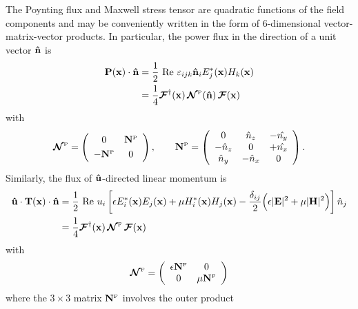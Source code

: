 \documentclass[letterpaper]{article}
\begin{document}
The Poynting flux and Maxwell stress tensor are quadratic functions
of the field components and may be conveniently written in the form
of 6-dimensional vector-matrix-vector products. 
In particular, the power flux in the direction of a unit vector 
$\mathbf{\hat n}$ is
\begin{align}
 \mathbf{P}(\mathbf{x}) \cdot \mathbf{\hat n}
   &=\frac{1}{2}\text{ Re }\varepsilon_{ijk}\mathbf{\hat n}_i E^*_j(\mathbf{x}) H_k(\mathbf{x})
\nonumber \\
   &=\frac{1}{4}\boldsymbol{\mathcal{F}}^\dagger(\mathbf{x}) \, \boldsymbol{\mathcal{N}}^{\hbox{\tiny{P}}}(\mathbf{\hat n}) \, \boldsymbol{\mathcal{F}}(\mathbf{x})
\label{PVMVP}
\end{align}
with
$$
   \boldsymbol{\mathcal{N}}^{\hbox{\tiny{P}}}=
   \left(\begin{array}{cc}
   0       & \mathbf{N}^{\hbox{\tiny{P}}}   \\ [3pt]
  -\mathbf{N}^{\hbox{\tiny{P}}} & 0
   \end{array}\right), 
\qquad 
   \mathbf{N}^{\hbox{\tiny{P}}}
   =
   \left(\begin{array}{ccc}
   0          &  \hat{n}_z & -\hat{n_y} \\
  -\hat{n}_z  &  0         & +\hat{n_x} \\
   \hat{n}_y  & -\hat{n}_x & 0
   \end{array}\right).
$$
Similarly, the flux of $\mathbf{\hat u}$-directed linear momentum is
\begin{align}
 \mathbf{\hat u} \cdot \mathbf{T}(\mathbf{x}) \cdot \mathbf{\hat n} 
&=\frac{1}{2}\text{ Re } u_i
  \left[ \epsilon E^*_i(\mathbf{x}) E_j(\mathbf{x}) 
             +\mu H^*_i(\mathbf{x}) H_j(\mathbf{x}) 
       -\frac{\delta_{ij}}{2}
         \Big( \epsilon |\mathbf{E}|^2
              +\mu      |\mathbf{H}|^2
         \Big)
 \right] \hat {n}_j
\nonumber \\
&= \frac{1}{4}\boldsymbol{\mathcal{F}}^\dagger(\mathbf{x}) 
   \, \boldsymbol{\mathcal{N}}^{\hbox{\tiny{F}}} \, \boldsymbol{\mathcal{F}}(\mathbf{x})
\label{IFVMVP}
\end{align}
with
$$
   \boldsymbol{\mathcal{N}}^{\hbox{\tiny{F}}}
    =
   \left(\begin{array}{cc}
   \epsilon \mathbf{N}^{\hbox{\tiny{F}}} & 0 \\
            0        & \mu \mathbf{N}^{\hbox{\tiny{F}}}
   \end{array}\right)
$$
where the $3\times 3$ matrix $\mathbf{N}^{\hbox{\tiny{F}}}$ 
involves the outer product
\end{document}
